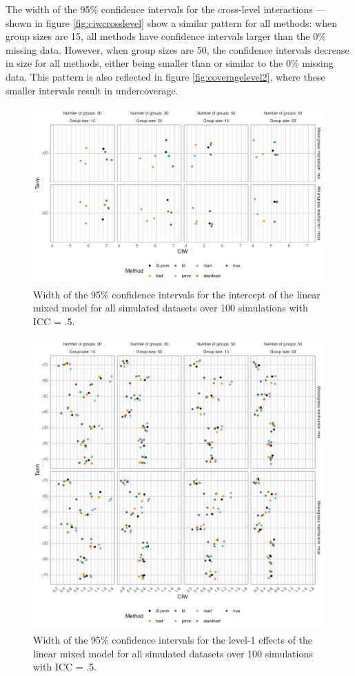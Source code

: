 \documentclass[10pt, a4paper, titlepage]{article}
\begin{document}
The width of the 95\% confidence intervals for the cross-level interactions --- shown in figure \ref{fig:ciwcrosslevel} show a similar pattern for all methods: when group sizes are 15, all methods have confidence intervals larger than the 0\% missing data. However, when group sizes are 50, the confidence intervals decrease in size for all methods, either being smaller than or similar to the 0\% missing data. This pattern is also reflected in figure \ref{fig:coveragelevel2}, where these smaller intervals result in undercoverage.

\begin{figure}[H]
    \centering
    \includegraphics[width=1\textwidth]{ciwintercept.png}
    \caption{Width of the 95\% confidence intervals for the intercept of the linear mixed model for all simulated datasets over 100 simulations with ICC = .5.}
    \label{fig:ciwintercept}
\end{figure}

\begin{figure}[H]
    \centering
    \includegraphics[width=1\textwidth]{ciwlevel1.png}
    \caption{Width of the 95\% confidence intervals for the level-1 effects of the linear mixed model for all simulated datasets over 100 simulations with ICC = .5.}
    \label{fig:ciwlevel1}
\end{figure}
\end{document}
